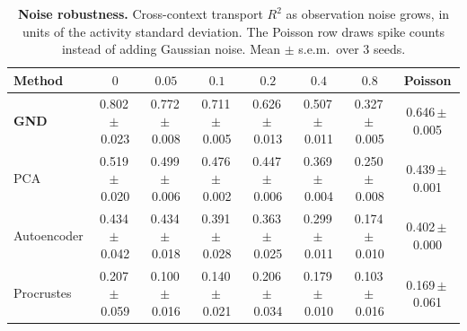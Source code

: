 \begin{table}[t]
\centering
\caption{\textbf{Noise robustness.} Cross-context transport $R^2$ as observation noise grows, in units of the activity standard deviation. The Poisson row draws spike counts instead of adding Gaussian noise. Mean $\pm$ s.e.m.\ over 3 seeds.}
\label{tab:noise}
\vspace{2pt}
\small
\begin{tabular}{lccccccc}
\toprule
Method & $0$ & $0.05$ & $0.1$ & $0.2$ & $0.4$ & $0.8$ & Poisson \\
\midrule
\textbf{GND} & 0.802\,\tiny{$\pm$\,0.023} & 0.772\,\tiny{$\pm$\,0.008} & 0.711\,\tiny{$\pm$\,0.005} & 0.626\,\tiny{$\pm$\,0.013} & 0.507\,\tiny{$\pm$\,0.011} & 0.327\,\tiny{$\pm$\,0.005} & 0.646\,\tiny{$\pm$\,0.005} \\
PCA & 0.519\,\tiny{$\pm$\,0.020} & 0.499\,\tiny{$\pm$\,0.006} & 0.476\,\tiny{$\pm$\,0.002} & 0.447\,\tiny{$\pm$\,0.006} & 0.369\,\tiny{$\pm$\,0.004} & 0.250\,\tiny{$\pm$\,0.008} & 0.439\,\tiny{$\pm$\,0.001} \\
Autoencoder & 0.434\,\tiny{$\pm$\,0.042} & 0.434\,\tiny{$\pm$\,0.018} & 0.391\,\tiny{$\pm$\,0.028} & 0.363\,\tiny{$\pm$\,0.025} & 0.299\,\tiny{$\pm$\,0.011} & 0.174\,\tiny{$\pm$\,0.010} & 0.402\,\tiny{$\pm$\,0.000} \\
Procrustes & 0.207\,\tiny{$\pm$\,0.059} & 0.100\,\tiny{$\pm$\,0.016} & 0.140\,\tiny{$\pm$\,0.021} & 0.206\,\tiny{$\pm$\,0.034} & 0.179\,\tiny{$\pm$\,0.010} & 0.103\,\tiny{$\pm$\,0.016} & 0.169\,\tiny{$\pm$\,0.061} \\
\bottomrule
\end{tabular}
\end{table}
